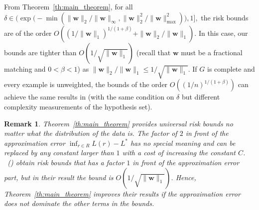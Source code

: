 \documentclass[letterpaper]{article} %
\newtheorem{remark}{Remark}
\newtheorem*{remark*}{Remark}
\newcommand{\weight}{\mathbf{w}}
\newcommand{\bayeserror}{L^*}
\newcommand{\risk}{L}
\newcommand{\normo}[1]{\|#1\|_1}
\newcommand{\complexbound}{\beta}
\newcommand{\citet}[1]{\citeauthor{#1}\ (\citeyear{#1})}
\begin{document}
From Theorem~\ref{th:main_theorem}, for all
$\delta\in\Bigg(\exp\Big(-\min(\|\weight{}\|_2/\|\weight{}\|_\infty,\|\weight{}\|_2^2/\|\weight{}\|_\max^2)\Big),1\Bigg],$ the risk bounds are of the order
$O\left((1/\normo{\weight{}})^{1/(1+\complexbound)}+\|\weight{}\|_2/\normo{\weight{}}\right).$ 
In this case, our bounds are tighter than $O(1/\sqrt{\normo{\weight{}}})$ (recall that $\weight{}$ must be a fractional matching and $0<\complexbound{}<1$)
as $\|\weight\|_2/\normo{\weight}\le 1/\sqrt{\normo{\weight}}$.
If $G$ is complete and every example is unweighted, the bounds of the order $O((1/n)^{1/(1+\complexbound)})$ can achieve the same results in \cite{papa2016graph} (with the same condition on $\delta$ but different complexity measurements of the hypothesis set).

\begin{remark*}
Theorem~\ref{th:main_theorem} provides universal risk bounds no matter what the distribution of the data is. The factor of $2$ in front of the approximation error $\inf_{r\in R}\risk(r)-\bayeserror$ has no special meaning and can be replaced by any constant larger than $1$ with a cost of increasing the constant $C$. 
\citet{wang2017learning} obtain risk bounds that has a factor $1$ in front of the approximation error part, but in their result the bound is $O(1/\sqrt{\normo{\weight{}}})$. 
Hence, Theorem~\ref{th:main_theorem} improves their results if the approximation error does not dominate the other terms in the bounds.
\end{remark*}

\end{document}
